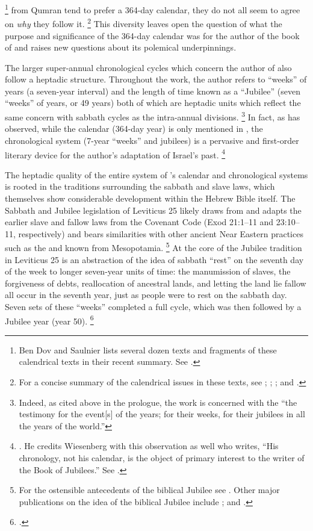     \footnote{Ben Dov and Saulnier lists several dozen texts and fragments of these calendrical texts in their recent summary. See \cite[132--133]{bendov-saulnier_cbr2008}.}
from Qumran tend to prefer a 364-day calendar, they do not all seem to agree on \emph{why} they follow it.%
    \footnote{For a concise summary of the calendrical issues in these texts, see \cite{vanderkam1998}; \cite[233--268]{glessmer_flint-vanderkam1999}; \cite[127--135]{bendov-saulnier_cbr2008}; and \cite{jacobus_brooke-hempel2018}.}
This diversity leaves open the question of what the purpose and significance of the 364-day calendar was for the author of the book of \jub and raises new questions about its polemical underpinnings.

The larger super-annual chronological cycles which concern the author of \jub also follow a heptadic structure. Throughout the work, the author refers to ``weeks'' of years (a seven-year interval) and the length of time known as a ``Jubilee'' (seven ``weeks'' of years, or 49 years) both of which are heptadic units which reflect the same concern with sabbath cycles as the intra-annual divisions.%
    \footnote{Indeed, as cited above in the prologue, the work is concerned with the ``the testimony for the event[s] of the years; for their weeks, for their jubilees in all the years of the world.''}
In fact, as \vanderkam has observed, while the calendar (364-day year) is only mentioned in , the chronological system (7-year ``weeks'' and jubilees) is a pervasive and first-order literary device for the author's adaptation of Israel's past.%
    \footnote{\cite[522]{vanderkam-b_vanderkam2000}. He credits Wiesenberg with this observation as well who writes, ``His chronology, not his calendar, is the object of primary interest to the writer of the Book of Jubilees.'' See \cite[4]{wiesenberg_rev-qumran1961}.}

The heptadic quality of the entire system of \jub's calendar and chronological systems is rooted in the traditions surrounding the sabbath and slave laws, which themselves show considerable development within the Hebrew Bible itself. The Sabbath and Jubilee legislation of Leviticus 25 likely draws from and adapts the earlier slave and fallow laws from the Covenant Code (Exod 21:1--11 and 23:10--11, respectively) and bears similarities with other ancient Near Eastern practices such as the  and  known from Mesopotamia.%
    \footnote{For the ostensible antecedents of the biblical Jubilee see \cite[1--51]{bergsma2007}. Other major publications on the idea of the biblical Jubilee include \cite{north1954}; \cite{fager1993} and \cite{lefebvre2003}.}
At the core of the Jubilee tradition in Leviticus 25 is an abstraction of the idea of sabbath ``rest'' on the seventh day of the week to longer seven-year units of time: the manumission of slaves, the forgiveness of debts, reallocation of ancestral lands, and letting the land lie fallow all occur in the seventh year, just as people were to rest on the sabbath day. Seven sets of these ``weeks'' completed a full cycle, which was then followed by a Jubilee year (year 50).%
    \footnote{\cite[85--92]{bergsma2007}.}

